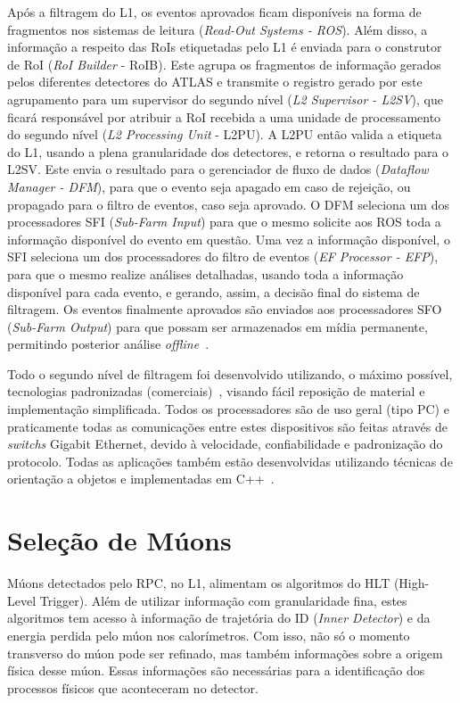 Após a filtragem do L1, os eventos aprovados ficam disponíveis na forma de
fragmentos nos sistemas de leitura (\emph{Read-Out Systems - ROS}).  Além
disso, a informação a respeito das RoIs etiquetadas pelo L1 é enviada para o
construtor de RoI (\emph{RoI Builder} - RoIB). Este agrupa os fragmentos de
informação gerados pelos diferentes detectores do ATLAS e transmite o registro
gerado por este agrupamento para um supervisor do segundo nível (\emph{L2
Supervisor - L2SV}), que ficará responsável por atribuir a RoI recebida a uma
unidade de processamento do segundo nível  (\emph{L2 Processing Unit} - L2PU).
A L2PU então valida a etiqueta do L1, usando a plena granularidade dos
detectores, e retorna o resultado para o L2SV. Este envia o resultado para o
gerenciador de fluxo de dados (\emph{Dataflow Manager - DFM}), para que o
evento seja apagado em caso de rejeição, ou propagado para o filtro de eventos,
caso seja aprovado.  O DFM seleciona um dos processadores SFI (\emph{Sub-Farm
Input}) para que o mesmo solicite aos ROS toda a informação disponível do
evento em questão. Uma vez a informação disponível, o SFI seleciona um dos
processadores do filtro de eventos (\emph{EF Processor - EFP}), para que o
mesmo realize análises detalhadas, usando toda a informação disponível para
cada evento, e gerando, assim, a decisão final do sistema de filtragem. Os
eventos finalmente aprovados são enviados aos processadores SFO (\emph{Sub-Farm
Output}) para que possam ser armazenados em mídia permanente, permitindo
posterior análise \emph{offline}~\cite{RIU2008}.

Todo o segundo nível de filtragem foi desenvolvido utilizando, o máximo
possível, tecnologias padronizadas (comerciais)~\cite{ANJOS2004}, visando
fácil reposição de material e implementação simplificada. Todos os
processadores são de uso geral (tipo PC) e praticamente todas as comunicações
entre estes dispositivos são feitas através de \emph{switchs} Gigabit Ethernet,
devido à velocidade, confiabilidade e padronização do protocolo. Todas as
aplicações também estão desenvolvidas utilizando técnicas de orientação a
objetos e implementadas em C++~\cite{SCHILDT2003}.


\section{Seleção de Múons}

Múons detectados pelo RPC, no L1, alimentam os algoritmos do HLT (High-Level
Trigger). Além de utilizar informação com granularidade fina, estes algoritmos
tem acesso à informação de trajetória do ID (\emph{Inner Detector}) e da energia
perdida pelo múon nos calorímetros. Com isso, não só o momento transverso do
múon pode ser refinado, mas também informações sobre a origem física desse múon.
Essas informações são necessárias para a identificação dos processos físicos que
aconteceram no detector.

